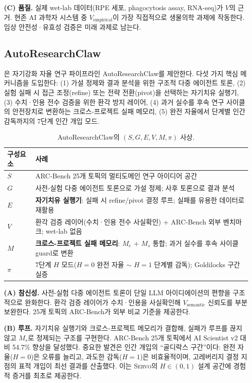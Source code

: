 \documentclass[11pt]{article}
\newcommand{\sgmvpi}{$(S, G, E, V, M, \pi)$}
\newcommand{\framework}{\textsc{Servo}}
\begin{document}
\noindent\textbf{(C) 품질.} 실제 wet-lab 데이터(RPE 세포, phagocytosis assay, RNA-seq)가 $V$의 근거. 현존 AI 과학자 시스템 중 $V_\text{empirical}$이 가장 직접적으로 생물의학 과제에 작동한다. 임상 안전성·유효성 검증은 미래 과제로 남는다.

\subsection{AutoResearchClaw}
\label{sec:autoresearchclaw}

\citet{liu2026autoresearchclaw}은 자기강화 자율 연구 파이프라인 AutoResearchClaw를 제안한다. 다섯 가지 핵심 메커니즘을 도입한다: (1) 가설 정제와 결과 분석을 위한 구조적 다중 에이전트 토론, (2) 실험 실패 시 접근 조정(refine) 또는 전략 전환(pivot)을 선택하는 자기치유 실행기, (3) 수치·인용 전수 검증을 위한 환각 방지 레이어, (4) 과거 실수를 후속 연구 사이클의 안전장치로 변환하는 크로스-프로젝트 실패 메모리, (5) 완전 자율에서 단계별 인간 감독까지의 7단계 인간 개입 모드.

\begin{table}[h]
\centering
\small
\begin{tabular}{@{}lp{9cm}@{}}
\toprule
구성요소 & 사례 \\
\midrule
$S$ & ARC-Bench 25개 토픽의 멀티도메인 연구 아이디어 공간 \\
$G$ & 사전-실험 다중 에이전트 토론으로 가설 정제; 사후 토론으로 결과 분석 \\
$E$ & \textbf{자기치유 실행기}: 실패 시 refine/pivot 결정 루프; 실패를 유용한 데이터로 재활용 \\
$V$ & 환각 검증 레이어(수치·인용 전수 사실확인) + ARC-Bench 외부 벤치마크; wet-lab 없음 \\
$M$ & \textbf{크로스-프로젝트 실패 메모리}: $M_e$ + $M_s$ 통합; 과거 실수를 후속 사이클 guard로 변환 \\
$\pi$ & 7단계 $H$ 모드($H=0$ 완전 자율 $\sim$ $H=1$ 단계별 감독); Goldilocks 구간 실증 \\
\bottomrule
\end{tabular}
\caption{AutoResearchClaw의 \sgmvpi{} 사상.}
\end{table}

\noindent\textbf{(A) 참신성.} 사전-실험 다중 에이전트 토론이 단일 LLM 아이디에이션의 편향을 구조적으로 완화한다. 환각 검증 레이어가 수치·인용을 사실확인해 $V_\text{semantic}$ 신뢰도를 부분 보완한다. 25개 토픽의 ARC-Bench가 외부 비교 기준을 제공한다.

\noindent\textbf{(B) 루프.} 자기치유 실행기와 크로스-프로젝트 메모리가 결합해, 실패가 루프를 끊지 않고 $M_s$로 정제되는 구조를 구현한다. ARC-Bench 25개 토픽에서 AI Scientist v2 대비 54.7\% 향상을 달성했다. 중요한 발견은 인간 개입의 ``골디락스 구간''이다: 완전 자율($H=0$)은 오류를 늘리고, 과도한 감독($H=1$)은 비효율적이며, 고레버리지 결정 지점의 표적 개입이 최선 결과를 산출했다. 이는 \framework{}의 $H \in (0,1)$ 설계 공간에 경험적 증거를 최초로 제공한다.
\end{document}

